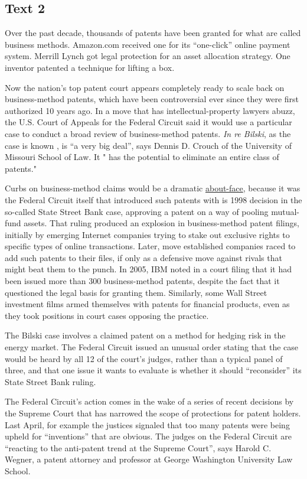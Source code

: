 \newpage
\subsection{Text 2}


Over the past decade, thousands of patents have been granted for what
are called business methods. Amazon.com received one for its  ``one-click''
online payment system. Merrill Lynch got legal protection for an asset
allocation strategy. One inventor patented a technique for lifting a
box.

Now the nation's top patent court appears completely ready to scale back
on business-method patents, which have been controversial ever since
they were first authorized 10 years ago. In a move that has
intellectual-property lawyers abuzz, the U.S. Court of Appeals for the Federal Circuit said
it would use a particular case to conduct a broad
review of business-method patents.  \emph{In re Bilski}, as the case is
known , is ``a very big deal'', says Dennis
D. Crouch of the University of
Missouri School of Law. It " has the potential to eliminate an entire
class of patents."

Curbs on business-method claims would be a dramatic \uline{about-face}, because
it was the Federal Circuit itself that introduced such patents with is
1998 decision in the so-called State Street Bank case, approving a
patent on a way of pooling mutual-fund assets. That ruling produced an
explosion in business-method patent filings, initially by emerging
Internet companies trying to stake out exclusive rights to specific
types of online transactions. Later, move established companies raced to
add such patents to their files, if only as a defensive move against
rivals that might beat them to the punch. In 2005, IBM noted in a court
filing that it had been issued more than 300 business-method patents,
despite the fact that it questioned the legal basis for granting them.
Similarly, some Wall Street investment films armed themselves with
patents for financial products, even as they took positions in court
cases opposing the practice.

The Bilski case involves a claimed patent on a method for hedging risk
in the energy market. The Federal Circuit issued an unusual order
stating that the case would be heard by all 12 of the court's judges,
rather than a typical panel of three, and that one issue it wants to
evaluate is whether it should ``reconsider'' its State Street Bank ruling.

The Federal Circuit's action comes in the wake of a series of recent
decisions by the Supreme Court that has narrowed the scope of
protections for patent holders. Last April, for example the justices
signaled that too many patents were being upheld for ``inventions'' that
are obvious. The judges on the Federal Circuit are ``reacting to the
anti-patent trend at the Supreme Court'', says Harold C. Wegner, a patent
attorney and professor at George Washington University Law School.


